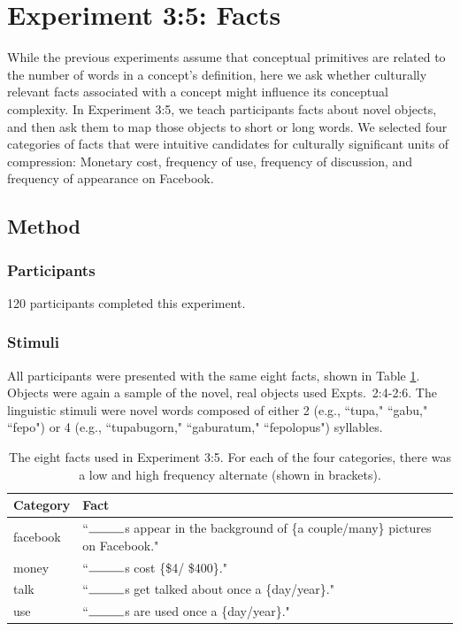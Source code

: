 \section{Experiment 3:5: Facts}
While the previous experiments assume that conceptual primitives are related to the number of words in a concept's definition, here we ask whether culturally relevant facts associated with a concept might influence its conceptual complexity. In Experiment 3:5,  we teach participants facts about novel objects, and then ask them to map those objects to short or long words. We selected four categories of facts  that were intuitive candidates for culturally significant units of compression: Monetary cost, frequency of use, frequency of discussion, and frequency of appearance on Facebook.

\subsection{Method}



\subsubsection{Participants}
120 participants completed this experiment. 
\subsubsection{Stimuli}
All participants were presented with the same eight facts, shown in Table \ref{tab:facts}. Objects were again a sample of the novel, real objects used Expts.\ 2:4-2:6.  The linguistic stimuli were novel words composed of either 2 (e.g., ``tupa," ``gabu," ``fepo")  or 4  (e.g., ``tupabugorn," ``gaburatum," ``fepolopus")  syllables.

\begin{table}[t!]
\centering

\begin{tabular}{ll}
\toprule
\textbf{Category} & \textbf{Fact}               \\
\toprule
   facebook & ``$\rule{1cm}{0.15mm}$s appear in the background of \{a couple/many\} pictures on Facebook."\\
   money  &  ``$\rule{1cm}{0.15mm}$s cost \{\$4/ \$400\}."   \\
   talk  & ``$\rule{1cm}{0.15mm}$s get talked about once a \{day/year\}." \\
   use    & ``$\rule{1cm}{0.15mm}$s are used once a \{day/year\}."                             \\

 \bottomrule
\end{tabular}
\caption{The eight facts used in Experiment 3:5. For each of the four categories, there was a low and high frequency alternate (shown in  brackets).}
\label{tab:facts}
\end{table}

